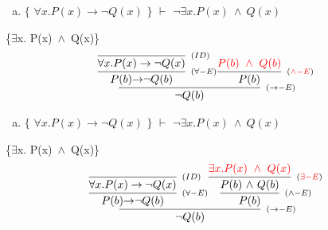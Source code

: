 \documentclass[aspectratio=43]{beamer}
\newcommand{\ria}{$\rightarrow$}
\newcommand{\ex}{$\exists$}
\newcommand{\nao}{$\neg$}
\newcommand{\andd}{$\wedge$}
\begin{document}
    \begin{frame}[fragile]
    	
    	\begin{enumerate}[b)]
			
			\item $\{$ $\forall x.P(x)\to \neg Q(x)$ $\}$ $\vdash$ $ \neg\exists  x.P(x)\ \wedge\ Q(x)$ \\ 
			
		\end{enumerate}
        \{\ex  x. P(x)\ \andd\ Q(x)\}
        \vspace{90pt}
        \[
        \begin{array}{c}
		
        	\infer[_{(\to-E)}]
            {$\nao$ Q(b)}
            {\infer[_{(\forall-E)}] 
            	{P(b) $\ria$ $\nao$ Q(b)}
               	{\infer[_{(ID)}]
                	{\forall x.P(x)\to \neg Q(x)}
                    {}
                } 
            \infer[_{(\textcolor{red}{\land-E})}] 
                {P(b)} 
                {\textcolor{red}{P(b)\ \wedge\ Q(b)}}
            }
		\end{array}
        \]
        
	\end{frame}
    
    
    \begin{frame}[fragile]
    	
    	\begin{enumerate}[b)]
			
			\item $\{$ $\forall x.P(x)\to \neg Q(x)$ $\}$ $\vdash$ $ \neg\exists  x.P(x)\ \wedge\ Q(x)$ \\ 
			
		\end{enumerate}
        \{\ex  x. P(x)\ \andd\ Q(x)\}
        \vspace{90pt}
        \[
        \begin{array}{c}
		
        	\infer[_{(\to-E)}]
            {$\nao$ Q(b)}
            {\infer[_{(\forall-E)}] 
            	{P(b) $\ria$ $\nao$ Q(b)}
               	{\infer[_{(ID)}]
                	{\forall x.P(x)\to \neg Q(x)}
                    {}
                } 
            \infer[_{(\land-E)}] 
                {P(b)} 
                {\infer[_{(\textcolor{red}{\exists-E})}] 
                        	{P(b)\ $\andd$\ Q(b)}
                        	{\textcolor{red}{\exists x.P(x)\ \wedge\ Q(x)}}
                }
            }
		\end{array}
        \]
        
	\end{frame}
    
\end{document}
